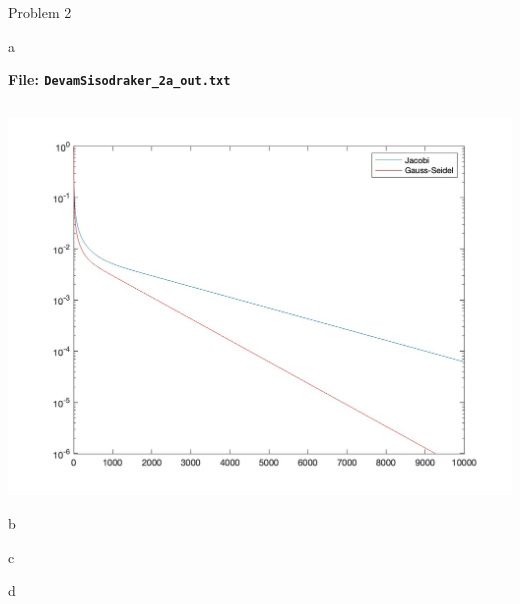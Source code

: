 \begin{section}{Problem 2}
\begin{solution}{a}
        \continued

        \begin{mdframed}
            \footnotesize
            \textbf{File: {\tt DevamSisodraker\_2a\_out.txt}}
            \inputminted{matlab}{DevamSisodraker_2a_out.txt}
            \normalfont
        \end{mdframed}

        \continued

        \begin{mdframed}[]
            \includegraphics[scale=0.33]{DevamSisodraker_2a.jpg}
        \end{mdframed}

    \end{solution}

    \newpage
    
    \begin{solution}{b}
    \end{solution}

    \newpage
    
    \begin{solution}{c}
    \end{solution}

    \newpage
    
    \begin{solution}{d}
    \end{solution}

\end{section}